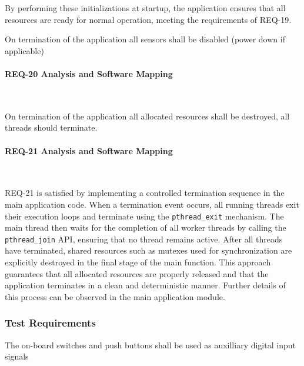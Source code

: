 \documentclass{article}
\begin{document}
By performing these initializations at startup, the application ensures that all 
resources are ready for normal operation, meeting the requirements of REQ-19.

\begin{tcolorbox}[
    title=REQ-20,
    colback=gray!5,
    colframe=black,
    fonttitle=\bfseries
]
On termination of the application all sensors shall be disabled (power down if applicable)
\end{tcolorbox}

\paragraph{REQ-20 Analysis and Software Mapping}\


\begin{tcolorbox}[
    title=REQ-21,
    colback=gray!5,
    colframe=black,
    fonttitle=\bfseries
]
On termination of the application all allocated resources shall be destroyed, all 
threads should terminate.
\end{tcolorbox}

\paragraph{REQ-21 Analysis and Software Mapping}\

REQ-21 is satisfied by implementing a controlled termination sequence in the main 
application code. When a termination event occurs, all running threads exit their 
execution loops and terminate using the \texttt{pthread\_exit} mechanism. The main thread then 
waits for the completion of all worker threads by calling the \texttt{pthread\_join} API, 
ensuring that no thread remains active. After all threads have terminated, shared 
resources such as mutexes used for synchronization are explicitly destroyed in the 
final stage of the main function. This approach guarantees that all allocated resources 
are properly released and that the application terminates in a clean and deterministic 
manner. Further details of this process can be observed in the main application module.

\subsubsection{Test Requirements}


\begin{tcolorbox}[
    title=REQ-25,
    colback=gray!5,
    colframe=black,
    fonttitle=\bfseries
]
The on-board switches and push buttons shall be used as auxilliary digital input signals
\end{tcolorbox}
\end{document}

